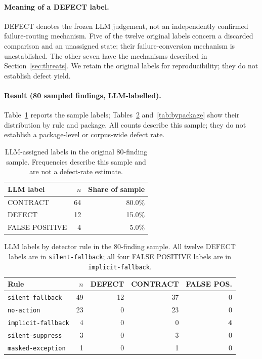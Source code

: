 \documentclass[10pt,a4paper]{article}
\begin{document}
\paragraph{Meaning of a DEFECT label.}
DEFECT denotes the frozen LLM judgement, not an independently confirmed
failure-routing mechanism. Five of the twelve original labels concern a
discarded comparison and an unassigned state; their failure-conversion
mechanism is unestablished. The other seven have the mechanisms described in
Section~\ref{sec:threats}. We retain the original labels for reproducibility;
they do not establish defect yield.

\paragraph{Result (80 sampled findings, LLM-labelled).} Table~\ref{tab:rq2}
reports the sample labels; Tables~\ref{tab:byrule} and~\ref{tab:bypackage}
show their distribution by rule and package. All counts describe this sample;
they do not establish a package-level or corpus-wide defect rate.

\begin{table}[htbp]
\centering\small
\caption{LLM-assigned labels in the original 80-finding sample. Frequencies
describe this sample and are not a defect-rate estimate.}
\label{tab:rq2}
\begin{tabular}{@{}lrr@{}}
\toprule
LLM label & $n$ & Share of sample \\
\midrule
CONTRACT & 64 & 80.0\% \\
DEFECT & 12 & 15.0\% \\
FALSE POSITIVE & 4 & 5.0\% \\
\bottomrule
\end{tabular}
\end{table}

\begin{table}[htbp]
\centering\small
\caption{LLM labels by detector rule in the 80-finding sample. All twelve
DEFECT labels are in \texttt{silent-fallback}; all four FALSE POSITIVE labels
are in \texttt{implicit-fallback}.}
\label{tab:byrule}
\begin{tabular}{@{}lrrrr@{}}
\toprule
Rule & $n$ & DEFECT & CONTRACT & FALSE POS. \\
\midrule
\texttt{silent-fallback} & 49 & 12 & 37 & 0 \\
\texttt{no-action} & 23 & 0 & 23 & 0 \\
\texttt{implicit-fallback} & 4 & 0 & 0 & \textbf{4} \\
\texttt{silent-suppress} & 3 & 0 & 3 & 0 \\
\texttt{masked-exception} & 1 & 0 & 1 & 0 \\
\bottomrule
\end{tabular}
\end{table}
\end{document}
